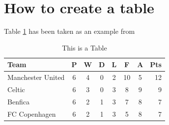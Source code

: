 \section{How to create a table}
Table \ref{tab:sample_table} has been taken as an example from \cite{latexTables}

\begin{table}
\centering
\begin{tabular}{l*{6}{c}r}
Team              & P & W & D & L & F  & A & Pts \\
\hline
Manchester United & 6 & 4 & 0 & 2 & 10 & 5 & 12  \\
Celtic            & 6 & 3 & 0 & 3 &  8 & 9 &  9  \\
Benfica           & 6 & 2 & 1 & 3 &  7 & 8 &  7  \\
FC Copenhagen     & 6 & 2 & 1 & 3 &  5 & 8 &  7  \\
\end{tabular}
\caption{This is a Table}
\label{tab:sample_table}
\end{table}